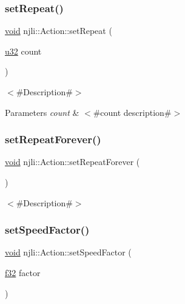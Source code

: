 \subsubsection{\texorpdfstring{set\+Repeat()}{setRepeat()}}
{\footnotesize\ttfamily \mbox{\hyperlink{_thread_8h_af1e856da2e658414cb2456cb6f7ebc66}{void}} njli\+::\+Action\+::set\+Repeat (\begin{DoxyParamCaption}\item[{\mbox{\hyperlink{_util_8h_a10e94b422ef0c20dcdec20d31a1f5049}{u32}}}]{count }\end{DoxyParamCaption})}

$<$\#\+Description\#$>$


\begin{DoxyParams}{Parameters}
{\em count} & $<$\#count description\#$>$ \\
\hline
\end{DoxyParams}
\mbox{\label{classnjli_1_1_action_a63707be93052a5843662ca386ff39fca}} 
\subsubsection{\texorpdfstring{set\+Repeat\+Forever()}{setRepeatForever()}}
{\footnotesize\ttfamily \mbox{\hyperlink{_thread_8h_af1e856da2e658414cb2456cb6f7ebc66}{void}} njli\+::\+Action\+::set\+Repeat\+Forever (\begin{DoxyParamCaption}{ }\end{DoxyParamCaption})}

$<$\#\+Description\#$>$ \mbox{\label{classnjli_1_1_action_a3aeafe981e3b127eb9ad728e88e31315}} 
\subsubsection{\texorpdfstring{set\+Speed\+Factor()}{setSpeedFactor()}}
{\footnotesize\ttfamily \mbox{\hyperlink{_thread_8h_af1e856da2e658414cb2456cb6f7ebc66}{void}} njli\+::\+Action\+::set\+Speed\+Factor (\begin{DoxyParamCaption}\item[{\mbox{\hyperlink{_util_8h_a5f6906312a689f27d70e9d086649d3fd}{f32}}}]{factor }\end{DoxyParamCaption})}

